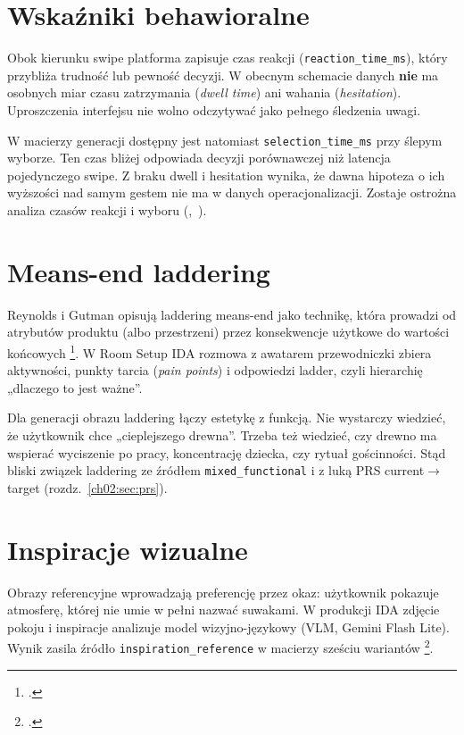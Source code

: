\section{Wskaźniki behawioralne}
\label{ch03:sec:behavioral}

Obok kierunku swipe platforma zapisuje czas reakcji (\texttt{reaction\_time\_ms}), który przybliża trudność lub pewność decyzji.
W obecnym schemacie danych \textbf{nie} ma osobnych miar czasu zatrzymania (\emph{dwell time}) ani wahania (\emph{hesitation}). Uproszczenia interfejsu nie wolno odczytywać jako pełnego śledzenia uwagi.

W macierzy generacji dostępny jest natomiast \texttt{selection\_time\_ms} przy ślepym wyborze. Ten czas bliżej odpowiada decyzji porównawczej niż latencja pojedynczego swipe.
Z braku dwell i hesitation wynika, że dawna hipoteza o ich wyższości nad samym gestem nie ma w danych operacjonalizacji. Zostaje ostrożna analiza czasów reakcji i wyboru (,~).

\section{Means-end laddering}
\label{ch03:sec:laddering}

Reynolds i Gutman opisują laddering means-end jako technikę, która prowadzi od atrybutów produktu (albo przestrzeni) przez konsekwencje użytkowe do wartości końcowych \footcite{reynolds1988laddering}.
W Room Setup IDA rozmowa z awatarem przewodniczki zbiera aktywności, punkty tarcia (\emph{pain points}) i odpowiedzi ladder, czyli hierarchię „dlaczego to jest ważne”.

Dla generacji obrazu laddering łączy estetykę z funkcją. Nie wystarczy wiedzieć, że użytkownik chce „cieplejszego drewna”. Trzeba też wiedzieć, czy drewno ma wspierać wyciszenie po pracy, koncentrację dziecka, czy rytuał gościnności.
Stąd bliski związek laddering ze źródłem \texttt{mixed\_functional} i z luką PRS current$\rightarrow$target (rozdz.~\ref{ch02:sec:prs}).

\section{Inspiracje wizualne}
\label{ch03:sec:inspiracje}

Obrazy referencyjne wprowadzają preferencję przez okaz: użytkownik pokazuje atmosferę, której nie umie w pełni nazwać suwakami.
W produkcji IDA zdjęcie pokoju i inspiracje analizuje model wizyjno-językowy (VLM, Gemini Flash Lite). Wynik zasila źródło \texttt{inspiration\_reference} w macierzy sześciu wariantów \footcite{idaPlatform2026}.

